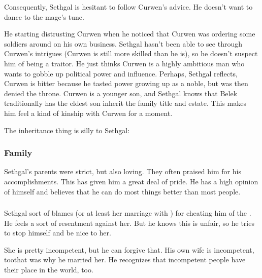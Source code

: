 Consequently, Sethgal is hesitant to follow Curwen's advice. 
He doesn't want to dance to the mage's tune. 

He starting distrusting Curwen when he noticed that Curwen was ordering some soldiers around on his own business. 
Sethgal hasn't been able to see through Curwen's intrigues (Curwen is still more skilled than he is), so he doesn't suspect him of being a traitor. 
He just thinks Curwen is a highly ambitious man who wants to gobble up political power and influence. 
Perhaps, Sethgal reflects, Curwen is bitter because he tasted power growing up as a noble, but was then denied the throne. 
Curwen is a younger son, and Sethgal knows that Belek traditionally has the eldest son inherit the family title and estate. 
This makes him feel a kind of kinship with Curwen for a moment. 

The inheritance thing is silly to Sethgal: 





\subsubsection{Family}
Sethgal's parents were strict, but also loving. 
They often praised him for his accomplishments. 
This has given him a great deal of pride. 
He has a high opinion of himself and believes that he can do most things better than most people. 





\subsubsection{\Tiroco}
Sethgal sort of blames  (or at least her marriage with \Icor) for cheating him of the \rayuthship. 
He feels a sort of resentment against her. 
But he knows this is unfair, so he tries to stop himself and be nice to her. 

She is pretty incompetent, but he can forgive that. 
His own wife is incompetent, too\dash that was why he married her. 
He recognizes that incompetent people have their place in the world, too. 









